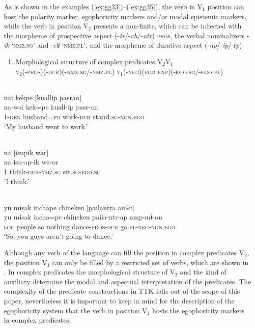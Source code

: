 \documentclass[output=paper]{langsci/langscibook}
\begin{document}
\largerpage[2]
As is shown in the examples (\ref{ex:gg33})--(\ref{ex:gg35}), the verb in V$_1$ position can host the polarity marker, egophoricity markers and/or modal epistemic markers, while the verb in position V$_2$ presents a non-finite, which can be inflected with the morpheme of prospective aspect (-\textit{tr}/-\textit{ch}/-\textit{ntr}) \textsc{pros}, the verbal nominalizers -\textit{ik} `\textsc{nmz.sg}' and -\textit{elɨ} `\textsc{nmz.pl}', and the morpheme of durative aspect (-\textit{ap}/-\textit{ip}/-\textit{ɨp}).

\begin{enumerate}[resume]
    \item Morphological structure of complex predicates V$_2$V$_1$ \label{fig:gg3}\\
    \textsc{v}$_2$(-\textsc{pros})(-\textsc{dur})(-\textsc{nmz.sg/-nmz.pl})	\textsc{v}$_1$(-\textsc{neg})(\textsc{ego exp})(-\textsc{ego.sg/-ego.pl})
\end{enumerate}


\ea \label{ex:gg33}
\\
    \glll nai	kekpe	[kuallip	pasran]\\
    na-wai	kek=pe	kuall-ip pasr-an\\
         1-\textsc{gen}	husband=\textsc{pd}	work-\textsc{dur}	stand.\textsc{sg-non.ego}\\
    \glt ‘My husband went to work.'
\z

\ea \label{ex:gg34}
\\
    \glll na	[isupik	war]\\
    na	isu-ap-ik wa-or\\
         1	think-\textsc{dur-nmz.sg}	sit.\textsc{sg}-\textsc{ego.sg}\\
    \glt ‘I think.'
\z

\ea \label{ex:gg35}
\\
    \glll yu	misak	inchape	chineken	[pailantra	amɨn]\\
    yu	misak	incha=pe	chineken	paila-ntr-ap	amp-mɨ-an\\
         \textsc{loc} people	so nothing dance-\textsc{pros-dur} go.\textsc{pl-neg-non.ego}\\
    \glt ‘So, you guys aren't going to dance.'
\z

Although any verb of the language can fill the position in complex predicates V$_2$, the position V$_1$ can only be filled by a restricted set of verbs, which are shown in . In complex predicates the morphological structure of V$_2$ and the kind of auxiliary determine the modal and aspectual interpretation of the predicates. The complexity of the predicate constructions in TTK falls out of the scope of this paper, nevertheless it is important to keep in mind for the description of the egophoricity system that the verb in position V$_1$ hosts the egophoricity markers in complex predicates.
\end{document}
